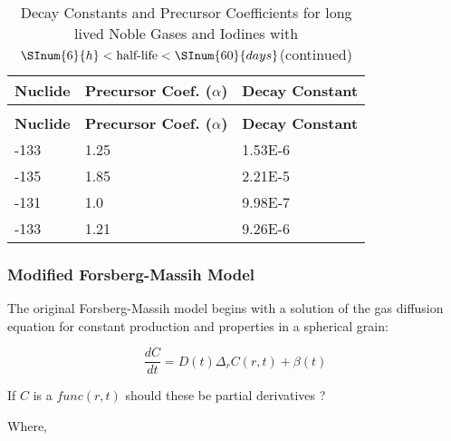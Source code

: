 \renewcommand{\captiontext}{Decay Constants and Precursor Coefficients for long lived Noble Gases and Iodines with $ \SInum{6}{h} < \text{half-life} < \SInum{60}{days}$}
\begin{longtable}[c]{K A{4.0cm} K}     
    \caption{\captiontext}    \label{tab:long_decay_constants_ans_fgr}    \\ \hline
            \textbf{Nuclide} & \textbf{Precursor Coef. ($\alpha$)} &             \textbf{Decay Constant} \\ \hline
    \endfirsthead
    \caption{\captiontext (continued)}   \\ \hline
            \textbf{Nuclide} & \textbf{Precursor Coef. ($\alpha$)} &             \textbf{Decay Constant} \\ \hline
    \endhead
        -133       & 1.25                                &             \num{1.53E-6}\\
        -135       & 1.85                                &             \num{2.21E-5}\\
        -131        & 1.0                                 &             \num{9.98E-7}\\
        -133        & 1.21                                &             \num{9.26E-6}\\ 
\end{longtable}


\subsubsection{Modified Forsberg-Massih Model} \label{section:modified-forsberg-massih-model}

The original Forsberg-Massih model begins with a solution of the gas
diffusion equation for constant production and properties in a spherical
grain:

\begin{equation}
    \label{eq:gas_diffusion_forsberg_massih}
    \frac{dC}{dt} = D\left( t \right)\Delta_{r}C\left( r,t \right) + \beta\left( t \right)
\end{equation}

{\color{red}If $C$ is a $func(r,t)$ should these be partial derivatives ?}

Where,

